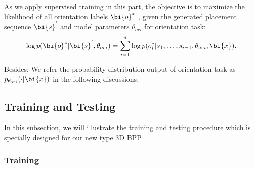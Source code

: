 As we apply supervised training in this part, the objective is to maximize the likelihood of all orientation labels $\bi{o}^{*}$ , given the generated placement sequence $\bi{s}^{'}$ and model parameters $\theta_{ori}$ for orientation task:
\begin{eqnarray*}
	\log{p(\bi{o}^{*}|\bi{s}^{'}, \theta_{ori})} = \sum_{i=1}^{n}\log{p(o_{i}^{*}|s_1,\dots,s_{i-1}, \theta_{ori}, \bi{x})}.
\end{eqnarray*}

Besides, We refer the probability distribution output of orientation task as $p_{\theta_{ori}}(\cdot|\bi{x})$ in the following discussions.

\subsection{Training and Testing}
\label{sec:training_Testing}
In this subsection, we will illustrate the training and testing procedure which is specially designed for our new type 3D BPP.
\subsubsection{Training}
\label{sec:train}

